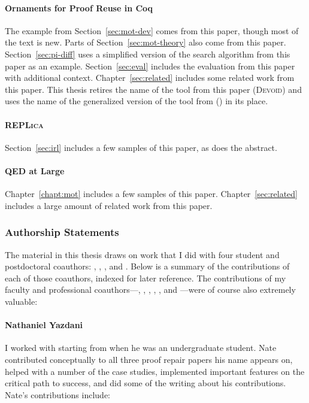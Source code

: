\paragraph{Ornaments for Proof Reuse in Coq}
The example from Section~\ref{sec:mot-dev} comes from this paper, though most of the text is new.
Parts of Section~\ref{sec:mot-theory} also come from this paper.
Section~\ref{sec:pi-diff} uses a simplified version of the search algorithm from this paper as an example.
Section~\ref{sec:eval} includes the evaluation from this paper with additional context.
Chapter~\ref{sec:related} includes some related work from this paper.
This thesis retires the name of the tool from this paper (\textsc{Devoid})
and uses the name of the generalized version of the tool from  (\toolnamec) in its place.

\paragraph{\textsc{REPLica}}
Section~\ref{sec:irl} includes a few samples of this paper, as does the abstract.

\paragraph{QED at Large}
Chapter~\ref{chapt:mot} includes a few samples of this paper.
Chapter~\ref{sec:related} includes a large amount of related work from this paper.

\subsubsection*{Authorship Statements}

The material in this thesis draws on work that I did with
four student and postdoctoral coauthors: , , ,
and .
Below is a summary of the contributions of each of those coauthors,
indexed for later reference.
The contributions of my faculty and professional coauthors---, , ,
, , and ---were of course also extremely valuable:

\paragraph{Nathaniel Yazdani}
I worked with  starting from when he was an undergraduate student.
Nate contributed conceptually to all three proof repair papers his name appears on,
helped with a number of the case studies,
implemented important features on the critical path to success,
and did some of the writing about his contributions.
Nate's contributions include:

